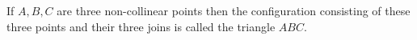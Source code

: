 If $A, B, C$ are three non-collinear points then the configuration consisting of these three points and their three joins is called the triangle $ABC$.
